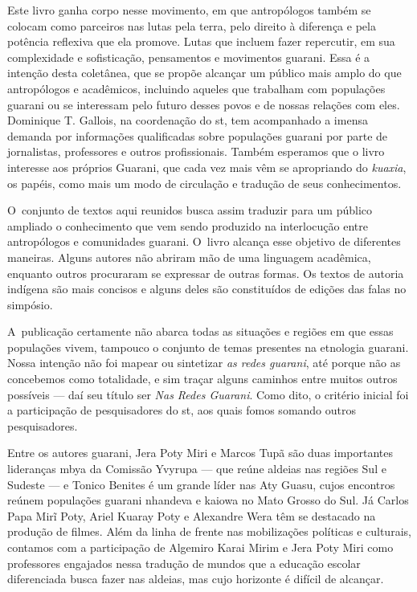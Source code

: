 Este livro ganha corpo nesse movimento, em que antropólogos também se
colocam como parceiros nas lutas pela terra, pelo direito à diferença e
pela potência reflexiva que ela promove. Lutas que incluem fazer
repercutir, em sua complexidade e sofisticação, pensamentos e
movimentos guarani. Essa é a intenção desta coletânea, que se propõe
alcançar um público mais amplo do que antropólogos e acadêmicos,
incluindo aqueles que trabalham com populações guarani ou se interessam
pelo futuro desses povos e de nossas relações com eles. Dominique T.
Gallois, na coordenação do st, tem acompanhado a imensa demanda por
informações qualificadas sobre populações guarani por
parte de jornalistas, professores e outros profissionais. Também esperamos que
o livro interesse aos próprios Guarani, que cada vez mais vêm se
apropriando do \emph{kuaxia}, os papéis, como mais um modo de circulação e
tradução de seus conhecimentos.

O~conjunto de textos aqui reunidos busca assim traduzir para um público
ampliado o conhecimento que vem sendo produzido na interlocução entre
antropólogos e comunidades guarani. O~livro alcança esse objetivo de
diferentes maneiras. Alguns autores não abriram mão de uma linguagem
acadêmica, enquanto outros procuraram se expressar de outras formas. Os
textos de autoria indígena são mais concisos e alguns deles são constituídos de
edições das falas no simpósio. 

A~publicação certamente não abarca todas as situações e regiões em que
essas populações vivem, tampouco o conjunto de temas presentes na
etnologia guarani. Nossa intenção não foi mapear ou sintetizar \emph{as redes
guarani}, até porque não as concebemos como totalidade, e sim traçar
alguns caminhos entre muitos outros possíveis --- daí seu título ser \emph{Nas
Redes Guarani}. Como dito, o critério inicial foi a participação de
pesquisadores do st, aos quais fomos somando outros pesquisadores. 

Entre os autores guarani, Jera Poty Miri e Marcos Tupã são duas
importantes lideranças mbya da Comissão Yvyrupa --- que reúne aldeias nas
regiões Sul e Sudeste --- e Tonico Benites é um grande líder nas Aty
Guasu, cujos encontros reúnem populações guarani nhandeva e kaiowa no
Mato Grosso do Sul. Já Carlos Papa Mirĩ Poty, Ariel Kuaray Poty e
Alexandre Wera têm se destacado na produção de filmes. Além da linha de
frente nas mobilizações políticas e culturais, contamos com a
participação de Algemiro Karai Mirim e Jera Poty Miri como professores
engajados nessa tradução de mundos que a educação escolar diferenciada
busca fazer nas aldeias, mas cujo horizonte é difícil de alcançar.

